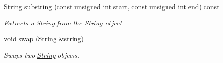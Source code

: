 \begin{DoxyCompactItemize}
\hyperlink{classsparky_1_1_string}{String} \hyperlink{classsparky_1_1_string_ae1b277e726b3faadb3f946e68e0391e5}{substring} (const unsigned int start, const unsigned int end) const 
\begin{DoxyCompactList}\small\item\em Extracts a \hyperlink{classsparky_1_1_string}{String} from the \hyperlink{classsparky_1_1_string}{String} object. \end{DoxyCompactList}\item 
void \hyperlink{classsparky_1_1_string_ad46d983942453704fa39ae3e2e849762}{swap} (\hyperlink{classsparky_1_1_string}{String} \&string)
\begin{DoxyCompactList}\small\item\em Swaps two \hyperlink{classsparky_1_1_string}{String} objects. \end{DoxyCompactList}\end{DoxyCompactItemize}
